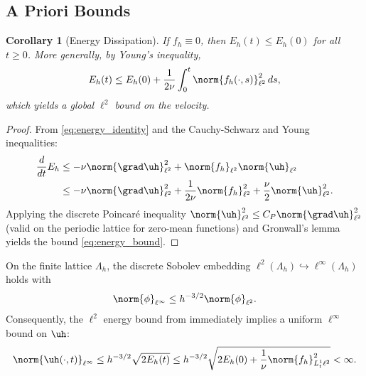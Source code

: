 \documentclass[12pt, a4paper]{article}
\theoremstyle{plain}
\newtheorem{corollary}[theorem]{Corollary}
\theoremstyle{definition}
\begin{document}
\subsection{A Priori Bounds}

\begin{corollary}[Energy Dissipation]\label{cor:dissipation}
  If $f_h \equiv 0$, then $E_h(t) \leq E_h(0)$ for all $t \geq 0$.
  More generally, by Young's inequality,
  \begin{equation}\label{eq:energy_bound}
    E_h(t) \leq E_h(0) + \frac{1}{2\nu} \int_0^t \norm{f_h(\cdot,s)}_{\ell^2}^2 \, ds,
  \end{equation}
  which yields a global $\ell^2$ bound on the velocity.
\end{corollary}

\begin{proof}
  From \eqref{eq:energy_identity} and the Cauchy-Schwarz and Young inequalities:
  \begin{align}
    \frac{d}{dt}E_h
    &\leq -\nu\norm{\grad\uh}_{\ell^2}^2 + \norm{f_h}_{\ell^2}\norm{\uh}_{\ell^2} \notag \\
    &\leq -\nu\norm{\grad\uh}_{\ell^2}^2 + \frac{1}{2\nu}\norm{f_h}_{\ell^2}^2
      + \frac{\nu}{2}\norm{\uh}_{\ell^2}^2.
  \end{align}
  Applying the discrete Poincar\'e inequality
  $\norm{\uh}_{\ell^2}^2 \leq C_P \norm{\grad\uh}_{\ell^2}^2$
  (valid on the periodic lattice for zero-mean functions) and Gronwall's
  lemma \citep{Gronwall1919} yields the bound \eqref{eq:energy_bound}.
\end{proof}

\begin{proposition}\label{prop:linfty}
  On the finite lattice $\Lambda_h$, the discrete Sobolev embedding
  $\ell^2(\Lambda_h) \hookrightarrow \ell^\infty(\Lambda_h)$ holds with
  \begin{equation}\label{eq:sobolev_embed}
    \norm{\phi}_{\ell^\infty} \leq h^{-3/2} \norm{\phi}_{\ell^2}.
  \end{equation}
  Consequently, the $\ell^2$ energy bound from 
  immediately implies a uniform $\ell^\infty$ bound on $\uh$:
  \begin{equation}
    \norm{\uh(\cdot,t)}_{\ell^\infty} \leq h^{-3/2} \sqrt{2E_h(t)}
    \leq h^{-3/2} \sqrt{2E_h(0) + \frac{1}{\nu}\norm{f_h}_{L^1_t \ell^2}^2} < \infty.
  \end{equation}
\end{proposition}
\end{document}
